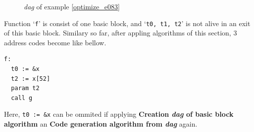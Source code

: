 \begin{Example}
\begin{figure}[htbp]
\begin{center}
\begin{latexonly}
\end{latexonly}
\caption{{\em dag} of example \ref{optimize_e083}}
\label{optimize_e084}
\end{center}
\end{figure}
Function `{\tt{f}}' is consist of one basic block,
and `{\tt{t0, t1, t2}}' is not alive in an exit of this basic block.
Similary so far, 
after appling algorithms of this section,
3 address codes become like bellow.
\begin{verbatim}
f:
  t0 := &x
  t2 := x[52]
  param t2
  call g
\end{verbatim}
Here, {\tt{t0 := \&x}} can be ommited if 
applying {\bf Creation {\em dag} of basic block algorithm} an
{\bf Code generation algorithm from {\em dag}} again.
\end{Example}

\begin{Example}
\label{optimize_e075}
\begin{verbatim}


\end{verbatim}
\end{Example}
